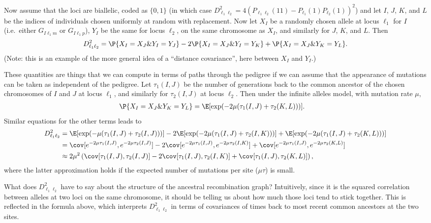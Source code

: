 
Now assume that the loci are biallelic, coded as $\{0,1\}$
(in which case $D_{\ell_1 \ell_2}^2  = 4 \left( P_{\ell_1 \ell_2}(1 1) - P_{\ell_1}(1) P_{\ell_2}(1) \right)^2$)
and let $I$, $J$, $K$, and $L$ be the indices of individuals chosen uniformly at random with replacement.
Now let $X_I$ be a randomly chosen allele at locus $\ell_1$ for $I$ (i.e.\ either $G_{I\ell_1m}$ or $G_{I\ell_1p}$),
$Y_I$ be the same for locus $\ell_2$, on the same chromosome as $X_I$,
and similarly for $J$, $K$, and $L$.
Then
\begin{align}
  D_{\ell_1 \ell_2}^2 = \P\{ X_I = X_J \& Y_I = Y_J \} - 2 \P\{ X_I = X_J \& Y_I = Y_K \} + \P\{ X_I = X_J \& Y_K = Y_L \} .
\end{align}
(Note: this is an example of the more general idea of a ``distance covariance'', here between $X_I$ and $Y_I$.)

These quantities are things that we can compute in terms of paths through the pedigree
if we can assume that the appearance of mutations can be taken as independent of the pedigree.
Let $\tau_1(I,J)$ be the number of generations back to the common ancestor of the chosen chromosomes of $I$ and $J$ at locus $\ell_1$,
and similarly for $\tau_2(I,J)$ at locus $\ell_2$.
Then under the infinite alleles model,
with mutation rate $\mu$, 
\begin{align}
  \P\{ X_I = X_J \& Y_K = Y_L \} &= \E[ \exp(-2\mu(\tau_1(I,J)+\tau_2(K,L))) ] .
\end{align}
Similar equations for the other terms leads to
\begin{align}
  D_{\ell_1 \ell_2}^2 &= \E[ \exp(-\mu(\tau_1(I,J)+\tau_2(I,J))) ] - 2 \E[ \exp(-2\mu(\tau_1(I,J)+\tau_2(I,K))) ] + \E[ \exp(-2\mu(\tau_1(I,J)+\tau_2(K,L))) ] \\
    &= \cov[ e^{-2\mu\tau_1(I,J)}, e^{-2\mu \tau_2(I,J)} ] - 2 \cov[ e^{-2\mu\tau_1(I,J)}, e^{-2\mu \tau_2(I,K)} ] + \cov[ e^{-2\mu\tau_1(I,J)}, e^{-2\mu \tau_2(K,L)} ] \\
    &\approx 2\mu^2 \left( \cov[ \tau_1(I,J),  \tau_2(I,J) ] - 2 \cov[ \tau_1(I,J),  \tau_2(I,K) ] + \cov[ \tau_1(I,J),  \tau_2(K,L) ] \right) ,
\end{align}
where the latter approximation holds if the expected number of mutations per site ($\mu \tau$) is small.


What does $D_{\ell_1 \ell_2}^2$ have to say about the structure of the ancestral recombination graph?
Intuitively, since it is the squared correlation between alleles at two loci on the same chromosome,
it should be telling us about how much those loci tend to stick together.
This is reflected in the formula above, which interprets $D_{\ell_1 \ell_2}^2$
in terms of covariances of times back to most recent common ancestors at the two sites.

